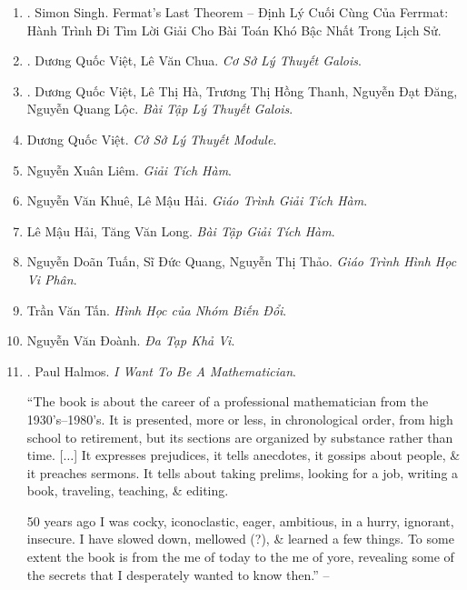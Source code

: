 \documentclass{article}
\begin{document}
\begin{enumerate}
	\item \cite{Singh_last_Fermat_thm_VN}. {\sc Simon Singh}. {Fermat's Last Theorem -- Định Lý Cuối Cùng Của Ferrmat: Hành Trình Đi Tìm Lời Giải Cho Bài Toán Khó Bậc Nhất Trong Lịch Sử}.\hfill{\sf[done]}
	
	\item \cite{Viet_Chua2022}. Dương Quốc Việt, Lê Văn Chua. {\it Cơ Sở Lý Thuyết Galois}.\hfill{\sf[reading]}
	
	\item \cite{Viet_Ha_Thanh_Dang_Loc2022}. Dương Quốc Việt, Lê Thị Hà, Trương Thị Hồng Thanh, Nguyễn Đạt Đăng, Nguyễn Quang Lộc. {\it Bài Tập Lý Thuyết Galois}.\hfill{\sf[reading]}
	\item Dương Quốc Việt. {\it Cở Sở Lý Thuyết Module}.
	
	\item Nguyễn Xuân Liêm. {\it Giải Tích Hàm}.
	
	\item Nguyễn Văn Khuê, Lê Mậu Hải. {\it Giáo Trình Giải Tích Hàm}.
	
	\item Lê Mậu Hải, Tăng Văn Long. {\it Bài Tập Giải Tích Hàm}.
	
	\item Nguyễn Doãn Tuấn, Sĩ Đức Quang, Nguyễn Thị Thảo. {\it Giáo Trình Hình Học Vi Phân}.
	
	\item Trần Văn Tấn. {\it Hình Học của Nhóm Biến Đổi}.
	
	\item Nguyễn Văn Đoành. {\it Đa Tạp Khả Vi}.
	
	\item \cite{Halmos1985}. {\sc Paul Halmos}. {\it I Want To Be A Mathematician}.
	
	``The book is about the career of a professional mathematician from the 1930's--1980's. It is presented, more or less, in chronological order, from high school to retirement, but its sections are organized by substance rather than time. [$\ldots$] It expresses prejudices, it tells anecdotes, it gossips about people, \& it preaches sermons. It tells about taking prelims, looking for a job, writing a book, traveling, teaching, \& editing.
	
	50 years ago I was cocky, iconoclastic, eager, ambitious, in a hurry, ignorant, insecure. I have slowed down, mellowed (?), \& learned a few things. To some extent the book is from the me of today to the me of yore, revealing some of the secrets that I desperately wanted to know then.'' -- \cite[Overture]{Halmos1985}
	

\end{enumerate}
\end{document}
